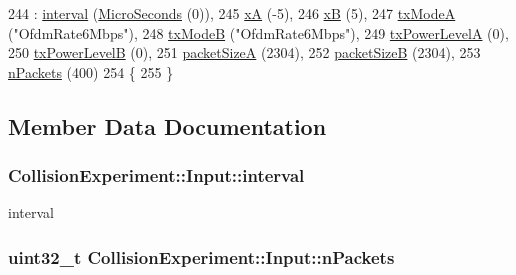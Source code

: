 \begin{DoxyCode}
244   : \hyperlink{structCollisionExperiment_1_1Input_a0cdb6cdbddfc779012c3a493344d00ad}{interval} (\hyperlink{group__timecivil_ga17465a639c8d1464e76538afdd78a9f0}{MicroSeconds} (0)),
245     \hyperlink{structCollisionExperiment_1_1Input_a62fb772dc1b9dd7564ec0436afaf77f1}{xA} (-5),
246     \hyperlink{structCollisionExperiment_1_1Input_a077d4ed496d30c5c298c570566ea592a}{xB} (5),
247     \hyperlink{structCollisionExperiment_1_1Input_a68c8bb4425d443eaab3ae2a8f3a476ff}{txModeA} (\textcolor{stringliteral}{"OfdmRate6Mbps"}),
248     \hyperlink{structCollisionExperiment_1_1Input_ae702c9a6f996817fed879b1c01c9afc5}{txModeB} (\textcolor{stringliteral}{"OfdmRate6Mbps"}),
249     \hyperlink{structCollisionExperiment_1_1Input_ac1c7cf8c05bcdf00b9d23c429b39ee7f}{txPowerLevelA} (0),
250     \hyperlink{structCollisionExperiment_1_1Input_a1e42b824a7acbea5e22bb14c6a1c18c8}{txPowerLevelB} (0),
251     \hyperlink{structCollisionExperiment_1_1Input_a4857a21fc98b74b3ada0056f1df2536c}{packetSizeA} (2304),
252     \hyperlink{structCollisionExperiment_1_1Input_ad5c970b5ed3681880d7c4b4501e26134}{packetSizeB} (2304),
253     \hyperlink{structCollisionExperiment_1_1Input_a1793eea68d7f45f5f37d534bc6f7594a}{nPackets} (400)
254 \{
255 \}
\end{DoxyCode}


\subsection{Member Data Documentation}
\subsubsection[{\texorpdfstring{interval}{interval}}]{ Collision\+Experiment\+::\+Input\+::interval}\hypertarget{structCollisionExperiment_1_1Input_a0cdb6cdbddfc779012c3a493344d00ad}{}\label{structCollisionExperiment_1_1Input_a0cdb6cdbddfc779012c3a493344d00ad}


interval 

\subsubsection[{\texorpdfstring{n\+Packets}{nPackets}}]{\setlength{\rightskip}{0pt plus 5cm}uint32\+\_\+t Collision\+Experiment\+::\+Input\+::n\+Packets}\hypertarget{structCollisionExperiment_1_1Input_a1793eea68d7f45f5f37d534bc6f7594a}{}\label{structCollisionExperiment_1_1Input_a1793eea68d7f45f5f37d534bc6f7594a}


